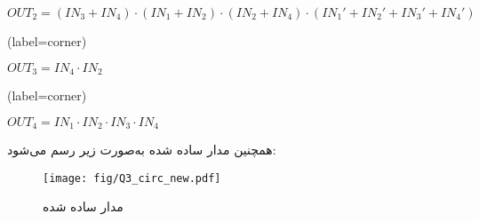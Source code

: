 \begin{enumerate}
\begin{latin}
\begin{minipage}{0.48\textwidth}
			$OUT_2=(IN_3 + IN_4) \cdot (IN_1 + IN_2) \cdot (IN_2 + IN_4) \cdot (IN_1'+IN_2'+IN_3'+IN_4')$
		\end{minipage}	
	\end{latin}
	
	
	
	
	
	
	
	
	\begin{latin}
		\begin{minipage}{0.48\textwidth}
			\centering
			\begin{karnaugh-map}[4][4][1][$IN_2$][$IN_1$][$IN_4$][$IN_3$](label=corner)
			\end{karnaugh-map}

			$OUT_3=IN_4 \cdot IN_2$
		\end{minipage}
		\hfill
		\begin{minipage}{0.48\textwidth}
			\centering
			\begin{karnaugh-map}[4][4][1][$IN_2$][$IN_1$][$IN_4$][$IN_3$](label=corner)
			\end{karnaugh-map}

			$OUT_4=IN_1 \cdot IN_2 \cdot IN_3 \cdot IN_4$
		\end{minipage}	
	\end{latin}
	
	همچنین مدار ساده شده به‌صورت زیر رسم می‌شود:
	
	\begin{figure}[h]
		\centering
		\texttt{[image: fig/Q3\_circ\_new.pdf]}
		\caption{مدار ساده شده}
		\label{Q3circ}
	\end{figure}
	
	
	
\end{enumerate}

